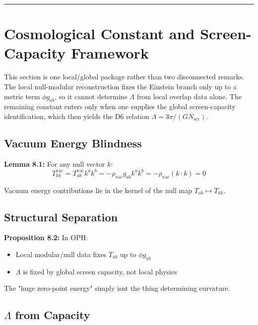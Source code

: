 \begin{center}\rule{0.5\linewidth}{0.5pt}\end{center}

\section{Cosmological Constant and Screen-Capacity Framework}\label{8-the-cosmological-constant-problem}

This section is one local/global package rather than two disconnected remarks. The local null-modular reconstruction fixes the Einstein branch only up to a metric term \(\phi g_{ab}\), so it cannot determine \(\Lambda\) from local overlap data alone. The remaining constant enters only when one supplies the global screen-capacity identification, which then yields the D6 relation \(\Lambda = 3\pi/(G N_{\mathrm{scr}})\).

\subsection{Vacuum Energy Blindness}\label{81-vacuum-energy-blindness}

\textbf{Lemma 8.1:} For any null vector \(k\): \[T^{\text{vac}}_{kk} = T^{\text{vac}}_{ab} k^a k^b = -\rho_{\text{vac}} g_{ab} k^a k^b = -\rho_{\text{vac}}(k \cdot k) = 0\]

Vacuum energy contributions lie in the kernel of the null map \(T_{ab} \mapsto T_{kk}\).

\subsection{Structural Separation}\label{82-structural-separation}

\textbf{Proposition 8.2:} In OPH:

\begin{itemize}
\tightlist
\item
 Local modular/null data fixes \(T_{ab}\) up to \(\phi g_{ab}\)
\item
 \(\Lambda\) is fixed by global screen capacity, not local physics
\end{itemize}

The "huge zero-point energy" simply isn\textquotesingle t the thing determining curvature.

\subsection{\texorpdfstring{\(\Lambda\) from Capacity}{Lambda from Capacity}}\label{83-ux3bb-from-capacity}

